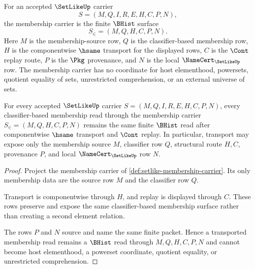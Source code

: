 \begin{definition}
\label{def:setlike-membership-carrier}
For an accepted $\SetLikeUp$ carrier
$$
S=(M,Q,I,R,E,H,C,P,N),
$$
the membership carrier is the finite $\BHist$ surface
$$
S_{\in}=(M,Q,H,C,P,N).
$$
Here $M$ is the membership-source row, $Q$ is the classifier-based membership row, $H$ is the componentwise $\hsame$ transport for the displayed rows, $C$ is the $\Cont$ replay route, $P$ is the $\Pkg$ provenance, and $N$ is the local $\NameCert_{\SetLikeUp}$ row. The membership carrier has no coordinate for host elementhood, powersets, quotient equality of sets, unrestricted comprehension, or an external universe of sets.
\end{definition}

\begin{theorem}
\label{thm:setlike-membership-stability}
For every accepted $\SetLikeUp$ carrier $S=(M,Q,I,R,E,H,C,P,N)$, every classifier-based membership read through the membership carrier $S_{\in}=(M,Q,H,C,P,N)$ remains the same finite $\BHist$ read after componentwise $\hsame$ transport and $\Cont$ replay. In particular, transport may expose only the membership source $M$, classifier row $Q$, structural route $H,C$, provenance $P$, and local $\NameCert_{\SetLikeUp}$ row $N$.
\end{theorem}
\begin{proof}
Project the membership carrier of \autoref{def:setlike-membership-carrier}. Its only membership data are the source row $M$ and the classifier row $Q$.

Transport is componentwise through $H$, and replay is displayed through $C$. These rows preserve and expose the same classifier-based membership surface rather than creating a second element relation.

The rows $P$ and $N$ source and name the same finite packet. Hence a transported membership read remains a $\BHist$ read through $M,Q,H,C,P,N$ and cannot become host elementhood, a powerset coordinate, quotient equality, or unrestricted comprehension.
\end{proof}

